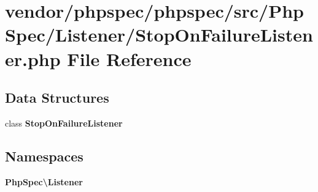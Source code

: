 \section{vendor/phpspec/phpspec/src/\+Php\+Spec/\+Listener/\+Stop\+On\+Failure\+Listener.php File Reference}
\label{_stop_on_failure_listener_8php}
\subsection*{Data Structures}
\begin{DoxyCompactItemize}
\item 
class {\bf Stop\+On\+Failure\+Listener}
\end{DoxyCompactItemize}
\subsection*{Namespaces}
\begin{DoxyCompactItemize}
\item 
 {\bf Php\+Spec\textbackslash{}\+Listener}
\end{DoxyCompactItemize}
